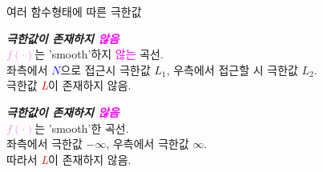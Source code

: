 \documentclass[aspectratio=169]{beamer}
\begin{document}
\begin{frame}{여러 함수형태에 따른 극한값}

  \begin{minipage}[t]{0.48\textwidth}
    \footnotesize
    \textbf{\emph{극한값이 존재하지 \textcolor{magenta}{않음}}}\\
    \scriptsize \textcolor{violet}{$f(\cdot)$}는 'smooth'하지 \textcolor{magenta}{않는} 곡선.\\
    좌측에서 \textcolor{blue}{$N$}으로 접근시 극한값 $L_1$, 우측에서 접근할 시 극한값 $L_2$.\\
    극한값 \textcolor{red}{\emph{L}}이 존재하지 않음.
  \end{minipage}
  \hfill
  \begin{minipage}[t]{0.48\textwidth}
    \footnotesize
    \textbf{\emph{극한값이 존재하지 \textcolor{magenta}{않음}}}\\
    \scriptsize \textcolor{violet}{$f(\cdot)$}는 'smooth'한 곡선.\\
    좌측에서 극한값 $-\infty$, 우측에서 극한값 $\infty$.\\
    따라서 \textcolor{red}{\emph{L}}이 존재하지 않음.
  \end{minipage}
\end{frame}




\end{document}
